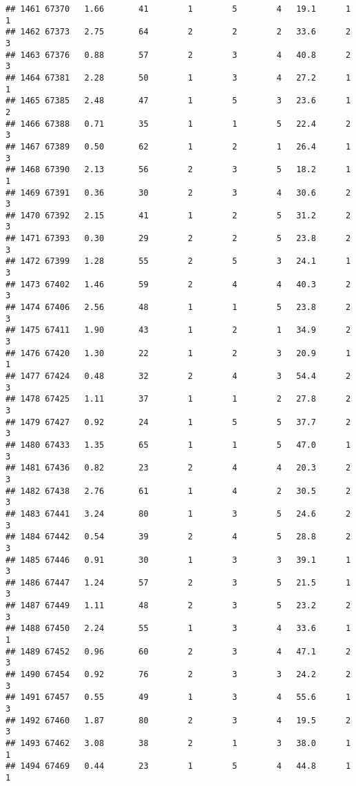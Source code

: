 \documentclass[
]{article}
\begin{document}
\begin{verbatim}
## 1461 67370   1.66       41        1        5        4   19.1      1      1
## 1462 67373   2.75       64        2        2        2   33.6      2      3
## 1463 67376   0.88       57        2        3        4   40.8      2      3
## 1464 67381   2.28       50        1        3        4   27.2      1      1
## 1465 67385   2.48       47        1        5        3   23.6      1      2
## 1466 67388   0.71       35        1        1        5   22.4      2      3
## 1467 67389   0.50       62        1        2        1   26.4      1      3
## 1468 67390   2.13       56        2        3        5   18.2      1      1
## 1469 67391   0.36       30        2        3        4   30.6      2      3
## 1470 67392   2.15       41        1        2        5   31.2      2      3
## 1471 67393   0.30       29        2        2        5   23.8      2      3
## 1472 67399   1.28       55        2        5        3   24.1      1      3
## 1473 67402   1.46       59        2        4        4   40.3      2      3
## 1474 67406   2.56       48        1        1        5   23.8      2      3
## 1475 67411   1.90       43        1        2        1   34.9      2      3
## 1476 67420   1.30       22        1        2        3   20.9      1      1
## 1477 67424   0.48       32        2        4        3   54.4      2      3
## 1478 67425   1.11       37        1        1        2   27.8      2      3
## 1479 67427   0.92       24        1        5        5   37.7      2      3
## 1480 67433   1.35       65        1        1        5   47.0      1      3
## 1481 67436   0.82       23        2        4        4   20.3      2      3
## 1482 67438   2.76       61        1        4        2   30.5      2      3
## 1483 67441   3.24       80        1        3        5   24.6      2      3
## 1484 67442   0.54       39        2        4        5   28.8      2      3
## 1485 67446   0.91       30        1        3        3   39.1      1      3
## 1486 67447   1.24       57        2        3        5   21.5      1      3
## 1487 67449   1.11       48        2        3        5   23.2      2      3
## 1488 67450   2.24       55        1        3        4   33.6      1      1
## 1489 67452   0.96       60        2        3        4   47.1      2      3
## 1490 67454   0.92       76        2        3        3   24.2      2      3
## 1491 67457   0.55       49        1        3        4   55.6      1      3
## 1492 67460   1.87       80        2        3        4   19.5      2      3
## 1493 67462   3.08       38        2        1        3   38.0      1      1
## 1494 67469   0.44       23        1        5        4   44.8      1      1

\end{verbatim}
\end{document}

